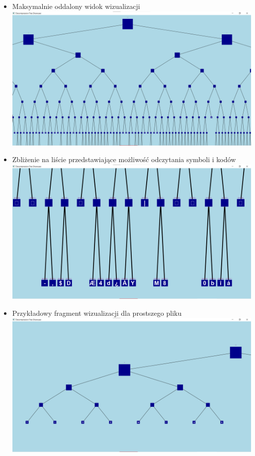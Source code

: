 \documentclass[]{article}
\begin{document}
\begin{itemize}
\item
Maksymalnie oddalony widok wizualizacji\\
\includegraphics[width=\textwidth]{tree1.png}
\item
Zbliżenie na liście przedstawiające możliwość odczytania symboli i kodów\\
\includegraphics[width=\textwidth]{tree2.png}
\newpage
\item
Przykładowy fragment wizualizacji dla prostszego pliku\\
\includegraphics[width=\textwidth]{tree3.png}
\end{itemize}
\end{document}
